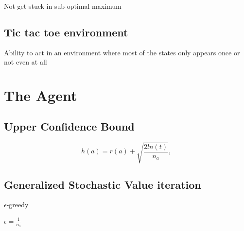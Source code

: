 \documentclass[11pt]{article}
\numberwithin{equation}{section}
\begin{document}
\begin{flushleft}
Not get stuck in sub-optimal maximum
\text{ } \newline

\subsection{Tic tac toe environment}

Ability to act in an environment where most of the states only appears once or not even at all
\text{ } \newline

\newpage

\text{ } \newline

\text{ } \newline

\text{ } \newline

\section{The Agent}

\text{ } \newline

\subsection{Upper Confidence Bound}

\text{ } \newline

$$h(a) = r(a) + \sqrt{\frac{2ln(t)}{n_a}},$$
\text{ } \newline

\newpage

\text{ } \newline

\text{ } \newline

\text{ } \newline

\subsection{Generalized Stochastic Value iteration}

\text{ } \newline

$\epsilon$-greedy \newline

$\epsilon = \frac{1}{n_s}$

\text{ } \newline


\end{flushleft}
\end{document}

